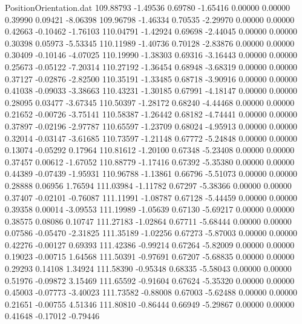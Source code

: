 \begin{filecontents}{PositionOrientation.dat}
 109.88793   -1.49536    0.69780    -1.65416    0.00000    0.00000    0.39990    0.09421   -8.06398
 109.96798   -1.46334    0.70535    -2.29970    0.00000    0.00000    0.42663   -0.10462   -1.76103
 110.04791   -1.42924    0.69698    -2.44045    0.00000    0.00000    0.30398    0.05973   -5.53345
 110.11989   -1.40736    0.70128    -2.83876    0.00000    0.00000    0.30409   -0.10146   -4.07025
 110.19990   -1.38303    0.69316    -3.16443    0.00000    0.00000    0.25673   -0.05122   -7.20314
 110.27192   -1.36454    0.68948    -3.68319    0.00000    0.00000    0.37127   -0.02876   -2.82500
 110.35191   -1.33485    0.68718    -3.90916    0.00000    0.00000    0.41038   -0.09033   -3.38663
 110.43231   -1.30185    0.67991    -4.18147    0.00000    0.00000    0.28095    0.03477   -3.67345
 110.50397   -1.28172    0.68240    -4.44468    0.00000    0.00000    0.21652   -0.00726   -3.75141
 110.58387   -1.26442    0.68182    -4.74441    0.00000    0.00000    0.37897   -0.02196   -2.97787
 110.65597   -1.23709    0.68024    -4.95913    0.00000    0.00000    0.32014   -0.03147   -3.61685
 110.73597   -1.21148    0.67772    -5.24848    0.00000    0.00000    0.13074   -0.05292    0.17964
 110.81612   -1.20100    0.67348    -5.23408    0.00000    0.00000    0.37457    0.00612   -1.67052
 110.88779   -1.17416    0.67392    -5.35380    0.00000    0.00000    0.44389   -0.07439   -1.95931
 110.96788   -1.13861    0.66796    -5.51073    0.00000    0.00000    0.28888    0.06956    1.76594
 111.03984   -1.11782    0.67297    -5.38366    0.00000    0.00000    0.37407   -0.02101   -0.76087
 111.11991   -1.08787    0.67128    -5.44459    0.00000    0.00000    0.39358    0.00014   -3.09553
 111.19989   -1.05639    0.67130    -5.69217    0.00000    0.00000    0.38575    0.08086    0.10747
 111.27183   -1.02864    0.67711    -5.68444    0.00000    0.00000    0.07586   -0.05470   -2.31825
 111.35189   -1.02256    0.67273    -5.87003    0.00000    0.00000    0.42276   -0.00127    0.69393
 111.42386   -0.99214    0.67264    -5.82009    0.00000    0.00000    0.19023   -0.00715    1.64568
 111.50391   -0.97691    0.67207    -5.68835    0.00000    0.00000    0.29293    0.14108    1.34924
 111.58390   -0.95348    0.68335    -5.58043    0.00000    0.00000    0.51976   -0.09872    3.15469
 111.65592   -0.91604    0.67624    -5.35320    0.00000    0.00000    0.45003   -0.07773   -3.40023
 111.73582   -0.88008    0.67003    -5.62488    0.00000    0.00000    0.21651   -0.00755    4.51346
 111.80810   -0.86444    0.66949    -5.29867    0.00000    0.00000    0.41648   -0.17012   -0.79446

\end{filecontents}
